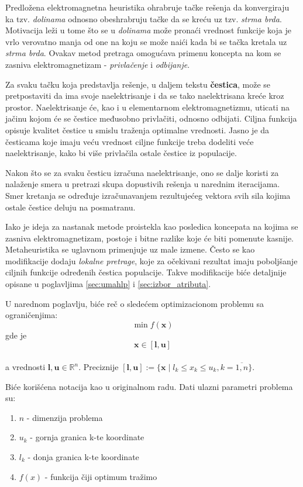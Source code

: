 \documentclass[a4paper]{article}
\begin{document}
Predložena elektromagnetna heuristika ohrabruje tačke rešenja da konvergiraju ka tzv. \textit{dolinama} odnosno obeshrabruju tačke da se kreću uz tzv. \textit{strma brda}. Motivacija leži u tome što se u \textit{dolinama} može pronaći vrednost funkcije koja je vrlo verovatno manja od one na koju se može naići kada bi se tačka kretala uz \textit{strma brda}. Ovakav metod pretraga omogućava primenu koncepta na kom se zasniva elektromagnetizam - \textit{privlačenje} i \textit{odbijanje}.

Za svaku tačku koja predstavlja rešenje, u daljem tekstu \textbf{čestica}, može se pretpostaviti da ima svoje naelektrisanje i da se tako naelektrisana kreće kroz prostor. Naelektrisanje će, kao i u elementarnom elektromagnetizmu, uticati na jačinu kojom će se čestice međusobno privlačiti, odnosno odbijati. Ciljna funkcija opisuje kvalitet čestice u smislu traženja optimalne vrednosti. Jasno je da česticama koje imaju veću vrednost ciljne funkcije treba dodeliti veće naelektrisanje, kako bi više privlačila ostale čestice iz populacije.

Nakon što se za svaku česticu izračuna naelektrisanje, ono se dalje koristi za nalaženje smera u pretrazi skupa dopustivih rešenja u narednim iteracijama. Smer kretanja se određuje izračunavanjem rezultujećeg vektora svih sila kojima ostale čestice deluju na posmatranu. 

Iako je ideja za nastanak metode proistekla kao posledica koncepata na kojima se zasniva elektromagnetizam, postoje i bitne razlike koje će biti pomenute kasnije. Metaheuristika se uglavnom primenjuje uz male izmene. Često se kao modifikacije dodaju \textit{lokalne pretrage}, koje za očekivani rezultat imaju poboljšanje ciljnih funkcije određenih čestica populacije. Takve modifikacije biće detaljnije opisane u poglavljima \ref{sec:umahlp} i \ref{sec:izbor_atributa}.

U narednom poglavlju, biće reč o sledećem optimizacionom problemu sa ograničenjima:
\[ \min f(\boldsymbol{x}) \] gde je \[ \boldsymbol{x} \in [\boldsymbol{l}, \boldsymbol{u}] \] \\
a vrednosti $\boldsymbol{l}, \boldsymbol{u} \in \mathbb{R}^n$. Preciznije 
$[\boldsymbol{l}, \boldsymbol{u}] := \{\boldsymbol{x} \mid l_{k} \leq x_{k} \leq u_{k}, k=\overline{1,n} \}$.

Biće korišćena notacija kao u originalnom radu\cite{electromagnetism-like}. Dati ulazni parametri problema su:

\begin{enumerate}
    \item $n$ - dimenzija problema
    \item $u_{k}$ - gornja granica k-te koordinate
    \item $l_{k}$ - donja granica k-te koordinate
    \item $f(x)$ - funkcija čiji optimum tražimo
\end{enumerate}
\clearpage
\end{document}
